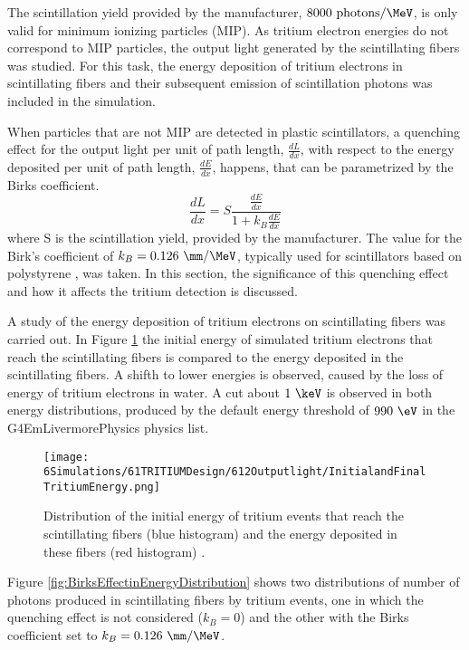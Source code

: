 The scintillation yield provided by the manufacturer, $8000~\text{photons}/\MeV$, is only valid for minimum ionizing particles (MIP). As tritium electron energies do not correspond to MIP particles, the output light generated by the scintillating fibers was studied. For this task, the energy deposition of tritium electrons in scintillating fibers and their subsequent emission of scintillation photons was included in the simulation.

When particles that are not MIP are detected in plastic scintillators, a quenching effect for the output light per unit of path length, $\frac{dL}{dx}$, with respect to the energy deposited per unit of path length, $\frac{dE}{dx}$, happens, that can be parametrized by the Birks coefficient\cite{BirksPaper}.
\begin{equation}
\frac{dL}{dx}= S\frac{\displaystyle{\frac{dE}{dx}}}{1+k_B\displaystyle{\frac{dE}{dx}}}
\label{eq:birkscoefficient}
\end{equation}
where S is the scintillation yield, provided by the manufacturer. The value for the Birk's coefficient of $k_B=0.126~\mm/\MeV$, typically used for scintillators based on polystyrene \cite{BirksCoefficient}, was taken. In this section, the significance of this quenching effect and how it affects the tritium detection is discussed.

A study of the energy deposition of tritium electrons on scintillating fibers was carried out. In Figure \ref{fig:InitialFinalTritiumEnergy} the initial energy of simulated tritium electrons that reach the scintillating fibers is compared to the energy deposited in the scintillating fibers. A shifth to lower energies is observed, caused by the loss of energy of tritium electrons in water. A cut about $1~\keV$ is observed in both energy distributions, produced by the default energy threshold of $990~\eV$ in the G4EmLivermorePhysics physics list.

\begin{figure}[h]
\centering
\texttt{[image: 6Simulations/61TRITIUMDesign/612Outputlight/InitialandFinalTritiumEnergy.png]}
\caption{Distribution of the initial energy of tritium events that reach the scintillating fibers (blue histogram) and the energy deposited in these fibers (red histogram) \cite{SimulationPaperCarlos}.\label{fig:InitialFinalTritiumEnergy}}
\end{figure}

Figure \ref{fig:BirksEffectinEnergyDistribution} shows two distributions of number of photons produced in scintillating fibers by tritium events, one in which the quenching effect is not considered ($k_B=0$) and the other with the Birks coefficient set to $k_B=0.126~\mm/\MeV$.

